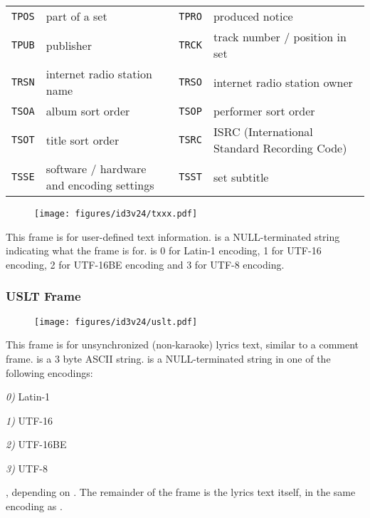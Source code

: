 \begin{table}[h]
{\begin{tabular}{|c|l||c|l|}
\texttt{TPOS} & part of a set &
\texttt{TPRO} & produced notice \\
\texttt{TPUB} & publisher &
\texttt{TRCK} & track number / position in set \\
\texttt{TRSN} & internet radio station name &
\texttt{TRSO} & internet radio station owner \\
\texttt{TSOA} & album sort order &
\texttt{TSOP} & performer sort order \\
\texttt{TSOT} & title sort order &
\texttt{TSRC} & ISRC (International Standard Recording Code) \\
\texttt{TSSE} & software / hardware and encoding settings &
\texttt{TSST} & set subtitle \\
\hline
\end{tabular}
}
\end{table}

\clearpage

\begin{figure}[h]
\texttt{[image: figures/id3v24/txxx.pdf]}
\end{figure}
This frame is for user-defined text information.
 is a NULL-terminated string indicating
what the frame is for.
 is 0 for Latin-1 encoding, 1 for UTF-16 encoding,
2 for UTF-16BE encoding and 3 for UTF-8 encoding.

\subsubsection{USLT Frame}
\begin{figure}[h]
\texttt{[image: figures/id3v24/uslt.pdf]}
\end{figure}
This frame is for unsynchronized (non-karaoke) lyrics text,
similar to a comment frame.
 is a 3 byte ASCII string.
 is a NULL-terminated string
in one of the following encodings:
\begin{inparaenum}
\item[\itshape 0\upshape)] Latin-1
\item[\itshape 1\upshape)] UTF-16
\item[\itshape 2\upshape)] UTF-16BE
\item[\itshape 3\upshape)] UTF-8
\end{inparaenum}
, depending on .
The remainder of the frame is the lyrics text itself,
in the same encoding as .

\clearpage

